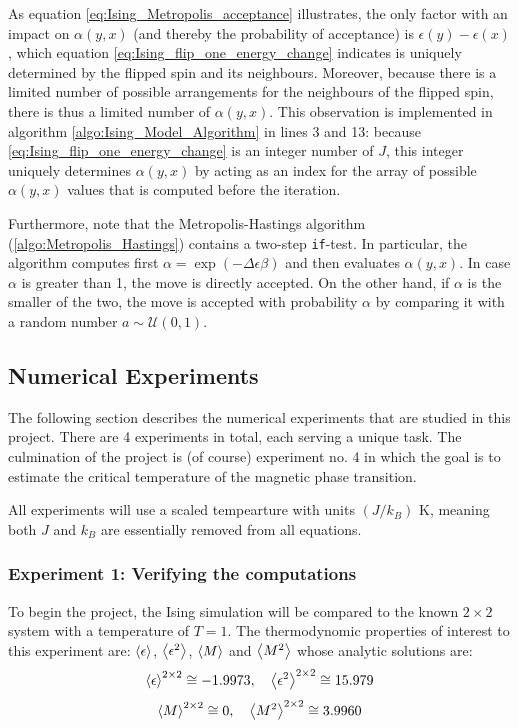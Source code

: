 \documentclass[nofootinbib,reprint,english]{revtex4-1}
\begin{document}
As equation \eqref{eq:Ising_Metropolis_acceptance} illustrates, the only factor with an impact on \(\alpha(y,x)\) (and thereby the probability of acceptance) is \(\epsilon(y)-\epsilon(x)\), which equation \eqref{eq:Ising_flip_one_energy_change} indicates is uniquely determined by the flipped spin and its neighbours. Moreover, because there is a limited number of possible arrangements for the neighbours of the flipped spin, there is thus a limited number of \(\alpha(y,x)\). This observation is implemented in algorithm \ref{algo:Ising_Model_Algorithm} in lines 3 and 13: because \eqref{eq:Ising_flip_one_energy_change} is an integer number of \(J\), this integer uniquely determines \(\alpha(y,x)\) by acting as an index for the array of possible \(\alpha(y,x)\) values that is computed before the iteration.

Furthermore, note that the Metropolis-Hastings algorithm (\ref{algo:Metropolis_Hastings}) contains a two-step \texttt{if}-test. In particular, the algorithm computes first \(\alpha=\exp(-\Delta\epsilon\beta)\) and then evaluates \(\alpha(y,x)\). In case \(\alpha\) is greater than 1, the move is directly accepted. On the other hand, if \(\alpha\) is the smaller of the two, the move is accepted with probability \(\alpha\) by comparing it with a random number \(a\sim\mathcal{U}(0,1)\). 


\subsection{Numerical Experiments}
The following section describes the numerical experiments that are studied in this project. There are 4 experiments in total, each serving a unique task. The culmination of the project is (of course) experiment no. 4 in which the goal is to estimate the critical temperature of the magnetic phase transition.

All experiments will use a scaled tempearture with units \((J/k_B)\) K, meaning both \(J\) and \(k_B\) are essentially removed from all equations.
\subsubsection{Experiment 1: Verifying the computations}
To begin the project, the Ising simulation will be compared to the known \(2\times2\) system with a temperature of \(T=1\). The thermodynomic properties of interest to this experiment are: \(\expval{\epsilon}\), \(\expval{\epsilon^2}\), \(\expval{M}\) and \(\expval{M^2}\) whose analytic solutions are:
\[\expval{\epsilon}^{2\times2}\cong-1.9973\qc\expval{\epsilon^2}^{2\times2}\cong15.979\]
\[\expval{M}^{2\times2}\cong0\qc\expval{M^2}^{2\times2}\cong3.9960\]
\end{document}
